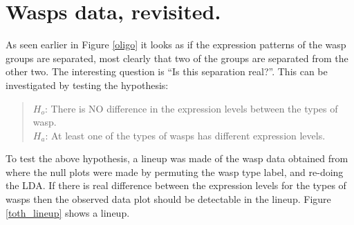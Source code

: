 
\section{Wasps data, revisited. }


As seen earlier in Figure \ref{oligo} it looks as if the expression patterns of the wasp groups are separated, most clearly that two of the groups are separated from the other two.  The interesting question is ``Is this separation real?''. This can be investigated by testing the hypothesis: 

\begin{quote}
$H_o$: There is NO difference in the expression levels between the types of wasp.\\
$H_a$: At least one of the types of wasps has different expression levels.
\end{quote}


To test the above hypothesis, a lineup was made of the wasp data obtained from \cite{toth:2010} where the null plots were made by permuting the wasp type label, and re-doing the LDA. If there is real difference between the expression levels for the types of wasps then the observed data plot should be detectable in the lineup. Figure \ref{toth_lineup} shows a lineup. 

